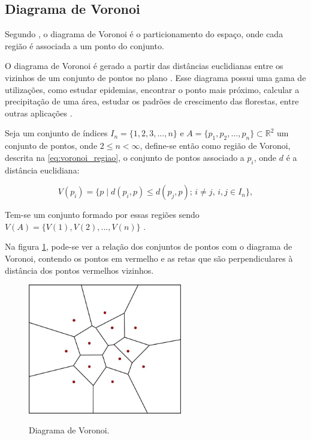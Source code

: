 \subsection{Diagrama de Voronoi}
\label{subsec:diagrama_de_voronoi}

Segundo , o diagrama de Voronoi é o particionamento do espaço, onde cada região é associada a um ponto do conjunto.

O diagrama de Voronoi é gerado a partir das distâncias euclidianas entre os vizinhos de um conjunto de pontos no plano \cite{diagrama_de_voronoi:_uma_exploracao_nas_distancias_euclidiana_e_do_taxi}. Esse diagrama possui uma gama de utilizações, como estudar epidemias, encontrar o ponto mais próximo, calcular a precipitação de uma área, estudar os padrões de crescimento das florestas, entre outras aplicações \cite{poligonos_de_thiessen_ou_voronoi}.

Seja um conjunto de índices $I_n = \{1, 2, 3, ..., n\}$ e $A = \{p_1, p_2, ..., p_n\} \subset \mathbb{R}^2$ um conjunto de pontos, onde $2 \leq n < \infty$, define-se então como região de Voronoi, descrita na \cref{eq:voronoi_regiao}, o conjunto de pontos associado a $p_i$, onde $d$ é a distância euclidiana:

\begin{equation}
	\label{eq:voronoi_regiao}
	V(p_i) = \{p \mid d(p_i, p) \leq d(p_j, p); \, i \neq j, \, i, j \in I_n\},
\end{equation}

Tem-se um conjunto formado por essas regiões sendo $V(A) = \{V(1), V(2), ..., V(n)\}$ \cite{rodrigues_diagrama_2019}.

Na figura \cref{fig:diagrama_voronoi}, pode-se ver a relação dos conjuntos de pontos com o diagrama de Voronoi, contendo os pontos em vermelho e as retas que são perpendiculares à distância dos pontos vermelhos vizinhos.

\begin{figure}[ht]
	\centering
	\caption{Diagrama de Voronoi.}
	\includegraphics[width=0.6\textwidth]{figures/diagrama_voronoi.png}
	\label{fig:diagrama_voronoi}
\end{figure}

